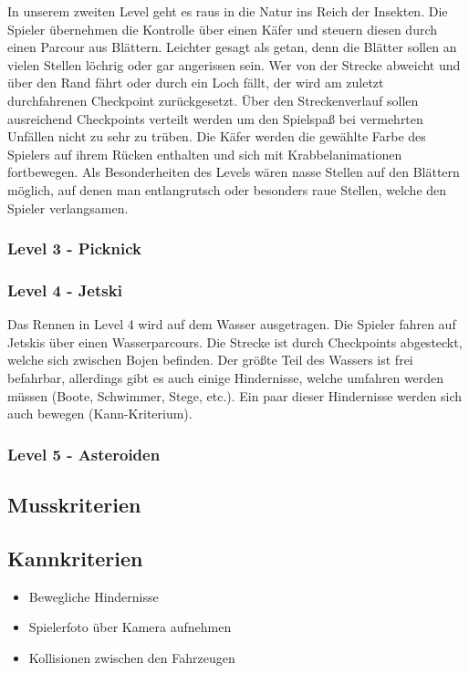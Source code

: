 In unserem zweiten Level geht es raus in die Natur ins Reich der Insekten. Die Spieler übernehmen die Kontrolle über einen Käfer und steuern diesen durch einen Parcour aus Blättern. Leichter gesagt als getan, denn die Blätter sollen an vielen Stellen löchrig oder gar angerissen sein. Wer von der Strecke abweicht und über den Rand fährt oder durch ein Loch fällt, der wird am zuletzt durchfahrenen Checkpoint zurückgesetzt. Über den Streckenverlauf sollen ausreichend Checkpoints verteilt werden um den Spielspaß bei vermehrten Unfällen nicht zu sehr zu trüben. Die Käfer werden die gewählte Farbe des Spielers auf ihrem Rücken enthalten und sich mit Krabbelanimationen fortbewegen. Als Besonderheiten des Levels wären nasse Stellen auf den Blättern möglich, auf denen man entlangrutsch oder besonders raue Stellen, welche den Spieler verlangsamen.

\subsubsection{Level 3 - Picknick}

\subsubsection{Level 4 - Jetski}

Das Rennen in Level 4 wird auf dem Wasser ausgetragen. Die Spieler fahren auf Jetskis über einen Wasserparcours. Die Strecke ist durch Checkpoints abgesteckt, welche sich zwischen Bojen befinden. Der größte Teil des Wassers ist frei befahrbar, allerdings gibt es auch einige Hindernisse, welche umfahren werden müssen (Boote, Schwimmer, Stege, etc.). Ein paar dieser Hindernisse werden sich auch bewegen (Kann-Kriterium).

\subsubsection{Level 5 - Asteroiden}

\subsection{Musskriterien}

\subsection{Kannkriterien}

\begin{itemize}
\item Bewegliche Hindernisse
\item Spielerfoto über Kamera aufnehmen
\item Kollisionen zwischen den Fahrzeugen
\end{itemize}


